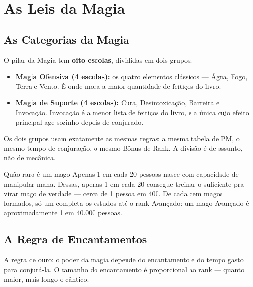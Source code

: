 \chapter{As Leis da Magia}

\section{As Categorias da Magia}

O pilar da Magia tem \textbf{oito escolas}, divididas em dois grupos:

\begin{itemize}
    \item \textbf{Magia Ofensiva (4 escolas):} os quatro elementos clássicos --- Água,
          Fogo, Terra e Vento. É onde mora a maior quantidade de feitiços do livro.
    \item \textbf{Magia de Suporte (4 escolas):} Cura, Desintoxicação, Barreira e
          Invocação. Invocação é a menor lista de feitiços do livro, e a única cujo efeito
          principal age sozinho depois de conjurado.
\end{itemize}

Os dois grupos usam exatamente as mesmas regras: a mesma tabela de PM, o mesmo tempo de
conjuração, o mesmo Bônus de Rank. A divisão é de assunto, não de mecânica.

\begin{nota}{Quão raro é um mago}
    Apenas 1 em cada 20 pessoas nasce com capacidade de manipular mana. Dessas, apenas 1
    em cada 20 consegue treinar o suficiente pra virar mago de verdade --- cerca de 1
    pessoa em 400. De cada cem magos formados, só um completa os estudos até o rank
    Avançado: um mago Avançado é aproximadamente 1 em 40.000 pessoas.
\end{nota}

\section{A Regra de Encantamentos}

A regra de ouro: o poder da magia depende do encantamento e do tempo gasto para conjurá-la.
O tamanho do encantamento é proporcional ao rank --- quanto maior, mais longo o cântico.

